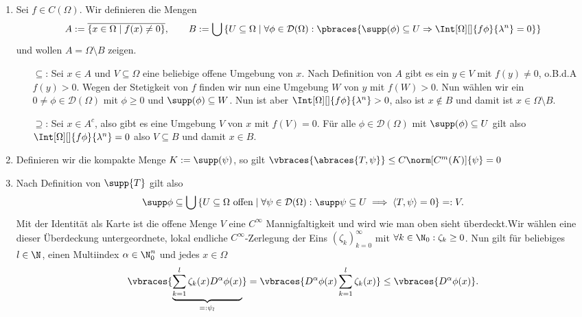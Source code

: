 \begin{solution}
\phantom{}
\begin{enumerate}[label = (\roman*)]
	\item Sei $f \in C(\Omega)$. Wir definieren die Mengen
	\begin{align*}
	A := \overline{\{x \in \Omega \mid f(x) \neq 0 \}}, \qquad B := \bigcup \left\{U \subseteq \Omega \mid \forall \phi \in \mathcal{D}(\Omega): \pbraces{\supp(\phi) \subseteq U \Rightarrow \Int[\Omega][]{f\phi}{\lambda^n} = 0} \right\}
	\end{align*}
	und wollen $A = \Omega \setminus B$ zeigen.
	\begin{enumerate}
		\item[$\subseteq$:] Sei $x \in A$ und $V \subseteq \Omega$ eine beliebige offene Umgebung von $x$. Nach Definition von $A$ gibt es ein $y \in V$ mit $f(y) \neq 0$, o.B.d.A $f(y) > 0$. Wegen der Stetigkeit von $f$ finden wir nun eine Umgebung $W$ von $y$ mit $f(W) > 0$. Nun wählen wir ein $0 \neq \phi \in \mathcal{D}(\Omega)$ mit $\phi \geq 0$ und $\supp(\phi) \subseteq W$. Nun ist aber $\Int[\Omega][]{f\phi}{\lambda^n} > 0$, also ist $x \notin B$ und damit ist $x \in \Omega \setminus B$.
		\item[$\supseteq$:] Sei $x \in A^c$, also gibt es eine Umgebung $V$ von $x$ mit $f(V) = 0$. Für alle $\phi \in \mathcal{D}(\Omega)$ mit $\supp(\phi) \subseteq U$ gilt also $\Int[\Omega][]{f\phi}{\lambda^n} = 0$ also $V \subseteq B$ und damit $x \in B$.
	\end{enumerate}
	\item Definieren wir die kompakte Menge $K := \supp(\psi)$, so gilt $\vbraces{\abraces{T, \psi}} \leq C \norm[C^m(K)]{\psi} = 0$
	\item Nach Definition von $\supp{T}$ gilt also
\begin{align}
    \supp\phi \subseteq \bigcup \left\{U \subseteq \Omega \text{~offen} \mid \forall \psi \in \mathcal{D}(\Omega): \supp\psi \subseteq U \implies \langle T, \psi\rangle = 0 \right\} =: V.
\end{align}
Mit der Identität als Karte ist die offene Menge $V$ eine $C^\infty$ Mannigfaltigkeit und wird wie man oben sieht überdeckt.Wir wählen eine dieser Überdeckung untergeordnete, lokal endliche $C^\infty$-Zerlegung der Eins $(\zeta_k)_{k=0}^\infty$ mit $\forall k \in \N_0: \zeta_k \geq 0$. Nun gilt für beliebiges $l \in \N$, einen Multiindex $\alpha \in \N_0^n$ und jedes $x \in \Omega$
\begin{align*}
\vbraces{\underbrace{\sum_{k=1}^l \zeta_k(x) D^\alpha \phi(x)}_{=:\psi_l}} =  \vbraces{D^\alpha \phi(x) \sum_{k=1}^l \zeta_k(x) } \leq \vbraces{D^\alpha \phi(x)}.

\end{align*}
\end{enumerate}
\end{solution}

